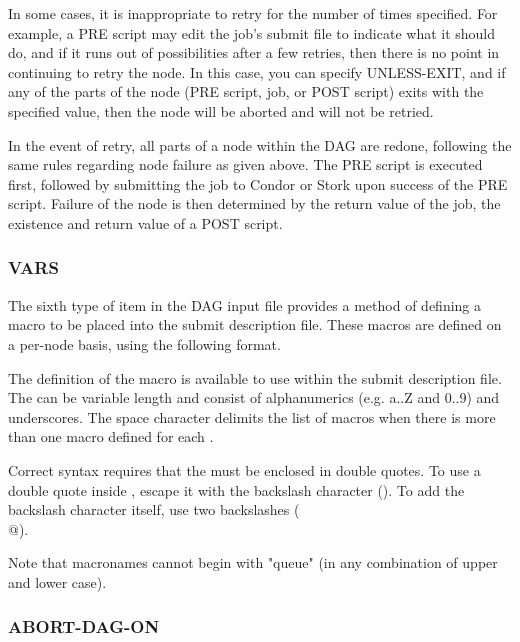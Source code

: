 In some cases, it is inappropriate to retry for the number of times
specified. For example, a PRE script may edit the job's submit file to
indicate what it should do, and if it runs out of possibilities after
a few retries, then there is no point in continuing to retry the
node. In this case, you can specify UNLESS-EXIT, and if any of the
parts of the node (PRE script, job, or POST script) exits with the
specified value, then the node will be aborted and will not be
retried.

In the event of retry, all parts of a node within the DAG
are redone, following the same rules regarding node failure
as given above.
The PRE script is executed first,
followed by submitting the job to Condor or Stork upon success of
the PRE script.
Failure of the node is then determined by the return value of
the job, the existence and return value of a POST script.

\subsubsection{VARS}

The sixth type of item in the DAG input file provides a
method of defining a macro to be placed into the submit description
file.
These macros are defined on a per-node basis, using the
following format.

  

The definition of the macro is available to use within the
submit description file.  The \verb@macroname@ can be variable
length and consist of alphanumerics (e.g. a..Z and 0..9) and
underscores.  The space character delimits the list of macros when
there is more than one macro defined for each .

Correct syntax requires that the \verb@string@ must be
enclosed in double quotes.
To use a double quote inside \verb@string@,
escape it with the backslash character (\verb@\@).
To add the backslash character itself, use two backslashes (\verb@\\@).

Note that macronames cannot begin with "queue" (in any combination
of upper and lower case).


\subsubsection{ABORT-DAG-ON}

